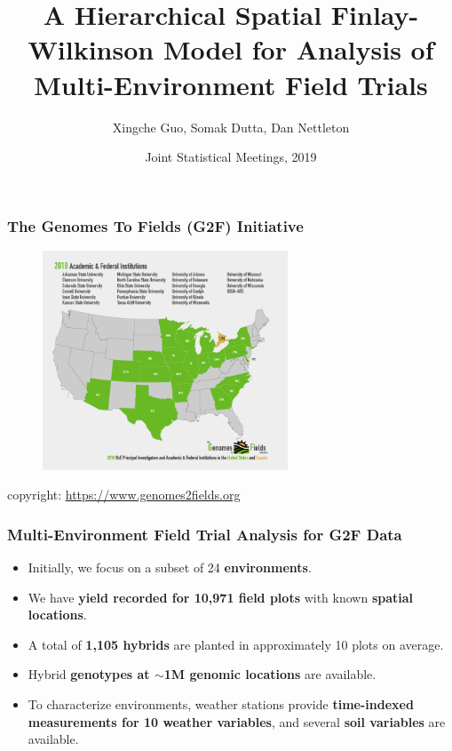 \documentclass{beamer}
\title[Hierarchical Spatial FW Model for MET]{A Hierarchical Spatial Finlay-Wilkinson Model for Analysis of Multi-Environment Field Trials}
\author[Guo, X., Dutta, S., Nettleton, D.]{Xingche Guo, Somak Dutta, Dan Nettleton}
\institute[ISU]{Dept. of Statistics, Iowa State University}
\date[JSM, 2019]{Joint Statistical Meetings, 2019}
\begin{document}
\begin{frame}
\titlepage
\end{frame}




\begin{frame}
	\frametitle{The Genomes To Fields (G2F) Initiative}
	\begin{figure}[H]
		\centering
		\includegraphics[width = 0.65\textwidth]{g2f_demo.png}
	\end{figure}	
	copyright:	\url{https://www.genomes2fields.org}
\end{frame}


\begin{frame}
	\frametitle{Multi-Environment Field Trial Analysis for G2F Data}
	\begin{itemize}
	\item Initially, we focus on a subset of 24 \textbf{environments}.
	\item We have \textbf{yield recorded for 10,971 field plots} with known \textbf{spatial locations}.
	\item A total of \textbf{1,105 hybrids} are planted in approximately 10 plots on average.
	\item Hybrid \textbf{genotypes at $\sim$1M genomic locations} are available.
	\item To characterize environments, weather stations provide \textbf{time-indexed measurements for 10 weather variables}, and several \textbf{soil variables} are available.
	\end{itemize}	
\end{frame}
\end{document}
